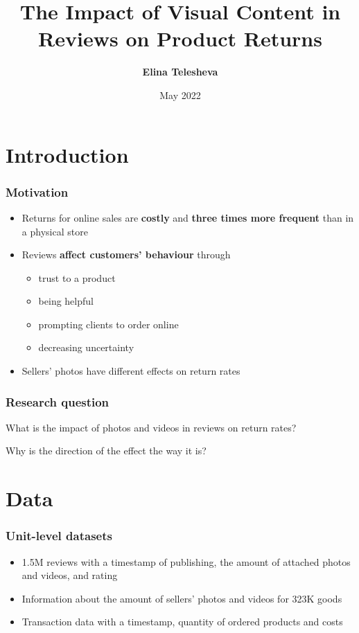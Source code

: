 \documentclass[xcolor=dvipsnames,envcountsect]{beamer}
\title[The Impact of Visual Content in Reviews on Product Returns]{The Impact of Visual Content in Reviews on Product Returns}
\author [Elina Telesheva]{\textbf{Elina Telesheva}}
\institute[Western Mindanao State University] {\emph{Advisor: }\textbf{Daria Dzyabura}\\[1em]
	NES \& HSE Joint Undergraduate Program\\[1em]
}
\date[May 2022]{\footnotesize May 2022}
\begin{document}
\begingroup
{}
\begin{frame}{\titlepage}\end{frame}
\endgroup
\section{Introduction}
\begin{frame}
	\frametitle{Motivation}
		\justifying
		\begin{itemize}
		    \item Returns for online sales are \textbf{costly} and \textbf{three times more frequent} than in a physical store \citep{wsj}
		    \item Reviews \textbf{affect customers' behaviour} through
		    \begin{itemize}
		        \item trust to a product \citep{cheng_flats}
		        \item being helpful \citep{sun_helpful, visual_text, fit_context}
		        \item prompting clients to order online \citep{flavian_pos_reviews}
		        \item decreasing uncertainty \citep{sahoo_reviews}
		    \end{itemize}
		    \item Sellers' photos have different effects on return rates \citep{de_zoom_technologies, hong_visual, dzyabura_image_ml} 
		\end{itemize}
\end{frame}


\begin{frame}
	\frametitle{Research question}
		\justifying
		What is the impact of photos and videos in reviews on return rates? 
		
		Why is the direction of the effect the way it is?
\end{frame}

\section{Data}
\begin{frame}
	\frametitle{Unit-level datasets}
	\begin{itemize}
	    \item 1.5M reviews with a timestamp of publishing, the amount of attached photos and videos, and rating
	    \item Information about the amount of sellers' photos and videos for 323K goods
	    \item Transaction data with a timestamp, quantity of ordered products and costs
	\end{itemize}
    
\end{frame}
\end{document}
